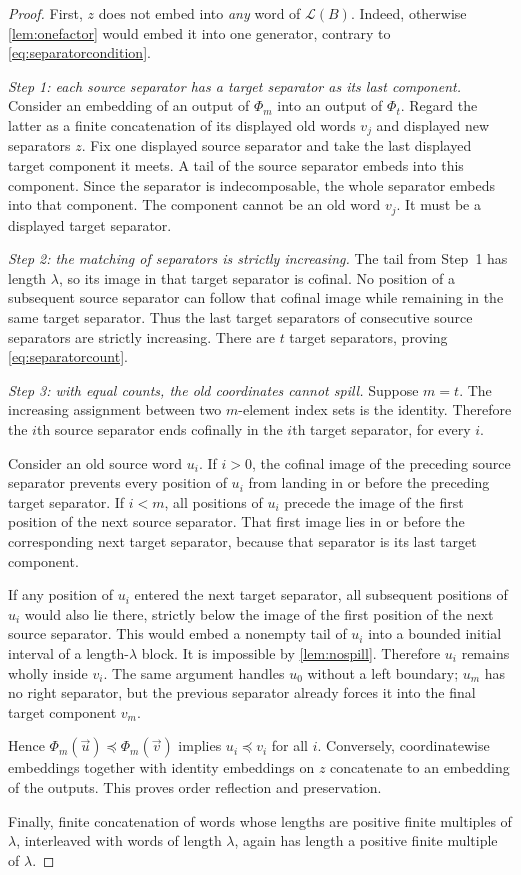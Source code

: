 \documentclass[11pt,letterpaper]{article}
\theoremstyle{definition}
\theoremstyle{remark}
\newcommand{\Lcal}{\mathcal L}
\newcommand{\emb}{\preccurlyeq}
\begin{document}
\begin{proof}
First, $z$ does not embed into \emph{any} word of $\Lcal(B)$.
Indeed, otherwise \cref{lem:onefactor} would embed it into one generator,
contrary to \eqref{eq:separatorcondition}.

\emph{Step 1: each source separator has a target separator as its last
component.} Consider an embedding of an output of $\Phi_m$ into an output
of $\Phi_t$. Regard the latter as a finite concatenation of its displayed
old words $v_j$ and displayed new separators $z$. Fix one displayed
source separator and take the last displayed target component it meets.
A tail of the source separator embeds into this component. Since the
separator is indecomposable, the whole separator embeds into that component.
The component cannot be an old word $v_j$. It must be a displayed target
separator.

\emph{Step 2: the matching of separators is strictly increasing.}
The tail from Step~1 has length $\lambda$, so its image in that target
separator is cofinal. No position of a subsequent source separator can
follow that cofinal image while remaining in the same target separator.
Thus the last target separators of consecutive source separators are
strictly increasing. There are $t$ target separators, proving
\eqref{eq:separatorcount}.

\emph{Step 3: with equal counts, the old coordinates cannot spill.}
Suppose $m=t$. The increasing assignment between two $m$-element index
sets is the identity. Therefore the $i$th source separator ends cofinally
in the $i$th target separator, for every $i$.

Consider an old source word $u_i$. If $i>0$, the cofinal image of the
preceding source separator prevents every position of $u_i$ from landing
in or before the preceding target separator. If $i<m$, all positions
of $u_i$ precede the image of the first position of the next source
separator. That first image lies in or before the corresponding next
target separator, because that separator is its last target component.

If any position of $u_i$ entered the next target separator, all subsequent
positions of $u_i$ would also lie there, strictly below the image of the
first position of the next source separator. This would embed a nonempty
tail of $u_i$ into a bounded initial interval of a length-$\lambda$ block.
It is impossible by \cref{lem:nospill}. Therefore $u_i$ remains wholly
inside $v_i$. The same argument handles $u_0$ without a left boundary;
$u_m$ has no right separator, but the previous separator already forces
it into the final target component $v_m$.

Hence $\Phi_m(\vec u)\emb\Phi_m(\vec v)$ implies
$u_i\emb v_i$ for all $i$. Conversely, coordinatewise embeddings together
with identity embeddings on $z$ concatenate to an embedding of the
outputs. This proves order reflection and preservation.

Finally, finite concatenation of words whose lengths are positive finite
multiples of $\lambda$, interleaved with words of length $\lambda$, again
has length a positive finite multiple of $\lambda$.
\end{proof}
\end{document}
